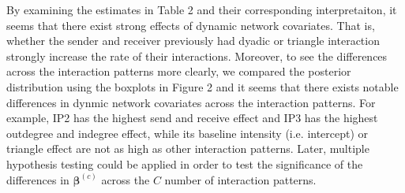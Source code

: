 \documentclass[a4paper]{article}
\begin{document}

By examining the estimates in Table 2 and their corresponding interpretaiton, it seems that there exist strong effects of dynamic network covariates. That is, whether the sender and receiver previously had dyadic or triangle interaction strongly increase the rate of their interactions. Moreover, to see the differences across the interaction patterns more clearly, we compared the posterior distribution using the boxplots in Figure 2 and it seems that there exists notable differences in dynmic network covariates across the interaction patterns. For example, IP2 has the highest send and receive effect and IP3 has the highest outdegree and indegree effect, while its baseline intensity (i.e. intercept) or triangle effect are not as high as other interaction patterns. Later, multiple hypothesis testing could be applied in order to test the significance of the differences in  $\boldsymbol{\beta}^{(c)}$ across the $C$ number of interaction patterns.\\\newline
\end{document}
